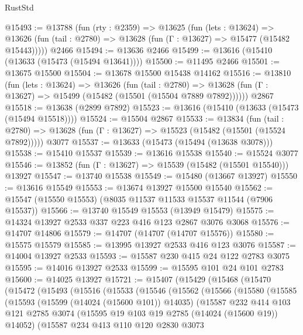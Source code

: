\begin{lexlean}{RustStd}
\begin{coremodule}
@15493 := @13788
    (fun (rty : @2359) =>
    @13625
      (fun (lets : @13624) =>
      @13626 (fun (tail : @2780) => @13628 (fun (Γ : @13627) => @15477 (@15482 @15443)))))
    @2466
@15494 := @13636 @2466
@15499 := @13616 (@15410 (@13633 (@15473 (@15494 @13641))))
@15500 := @11495 @2466
@15501 := @13675 @15500
@15504 := @13678 @15500 @15438 @14162
@15516 := @13810
    (fun (lets : @13624) =>
    @13626
      (fun (tail : @2780) =>
      @13628 (fun (Γ : @13627) => @15499 (@15482 (@15501 (@15504 @7889 @7892))))))
    @2867
@15518 := @13638 (@2899 @7892)
@15523 := @13616 (@15410 (@13633 (@15473 (@15494 @15518))))
@15524 := @15504 @2867
@15533 := @13834
    (fun (tail : @2780) => @13628 (fun (Γ : @13627) => @15523 (@15482 (@15501 (@15524 @7892)))))
    @3077
@15537 := @13633 (@15473 (@15494 (@13638 @3078)))
@15538 := @15410 @15537
@15539 := @13616 @15538
@15540 := @15524 @3077
@15546 := @13852 (fun (Γ : @13627) => @15539 (@15482 (@15501 @15540))) @13927
@15547 := @13740 @15538
@15549 := @15480 (@13667 @13927)
@15550 := @13616 @15549
@15553 := @13674 @13927 @15500 @15540
@15562 := @15547 (@15550 @15553) (@8035 @11537 @11533 @15537 @11544 (@7906 @15537))
@15566 := @13740 @15549 @15553 (@13949 @15479)
@15575 := @14324 @13927 @2533 @337 @223 @416 @123 @2867 @3076 @3068
@15576 := @14707 @14806
@15579 := @14707 (@14707 (@14707 @15576))
@15580 := @15575 @15579
@15585 := @13995 @13927 @2533 @416 @123 @3076
@15587 := @14004 @13927 @2533
@15593 := @15587 @230 @415 @24 @122 @2783 @3075
@15595 := @14016 @13927 @2533
@15599 := @15595 @101 @24 @101 @2783
@15600 := @14025 @13927
@15721 := @15407
    (@15429
      (@15468
        (@15470
          (@15472
            (@15493
              (@15516
                (@15533
                  (@15546
                    (@15562
                      (@15566
                        (@15580
                          (@15585
                            (@15593
                              (@15599 (@14024 (@15600 @101)) @14035)
                              (@15587
                                @232
                                @414
                                @103
                                @121
                                @2785
                                @3074
                                (@15595 @19 @103 @19 @2785 (@14024 (@15600 @19)) @14052)
                                (@15587
                                  @234
                                  @413
                                  @110
                                  @120
                                  @2830
                                  @3073

\end{coremodule}
\end{lexlean}
